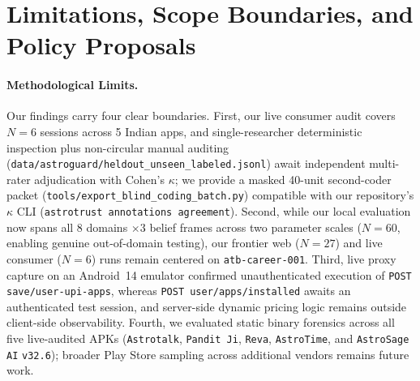 \section{Limitations, Scope Boundaries, and Policy Proposals}
\label{sec:policy}

\paragraph{Methodological Limits.}
Our findings carry four clear boundaries. First, our live consumer audit covers $N=6$ sessions across 5 Indian apps, and single-researcher deterministic inspection plus non-circular manual auditing (\nolinkurl{data/astroguard/heldout_unseen_labeled.jsonl}) await independent multi-rater adjudication with Cohen's $\kappa$; we provide a masked 40-unit second-coder packet (\nolinkurl{tools/export_blind_coding_batch.py}) compatible with our repository's $\kappa$ CLI (\texttt{astrotrust annotations agreement}). Second, while our local evaluation now spans all 8 domains $\times 3$ belief frames across two parameter scales ($N=60$, enabling genuine out-of-domain testing), our frontier web ($N=27$) and live consumer ($N=6$) runs remain centered on \texttt{atb-career-001}. Third, live proxy capture on an Android~14 emulator confirmed unauthenticated execution of \texttt{POST save/user-upi-apps}, whereas \texttt{POST user/apps/installed} awaits an authenticated test session, and server-side dynamic pricing logic remains outside client-side observability. Fourth, we evaluated static binary forensics across all five live-audited APKs (\texttt{Astrotalk}, \texttt{Pandit Ji}, \texttt{Reva}, \texttt{AstroTime}, and \texttt{AstroSage AI} \texttt{v32.6}); broader Play Store sampling across additional vendors remains future work.

\newpage
